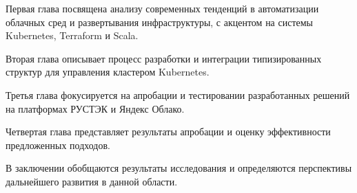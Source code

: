 Первая глава посвящена анализу современных тенденций в автоматизации облачных
сред и развертывания инфраструктуры, с акцентом на системы Kubernetes, Terraform
и Scala.

Вторая глава описывает процесс разработки и интеграции типизированных структур
для управления кластером Kubernetes.

Третья глава фокусируется на апробации и тестировании разработанных решений на
платформах РУСТЭК и Яндекс Облако.

Четвертая глава представляет результаты апробации и оценку эффективности
предложенных подходов.

В заключении обобщаются результаты исследования и определяются перспективы
дальнейшего развития в данной области.

